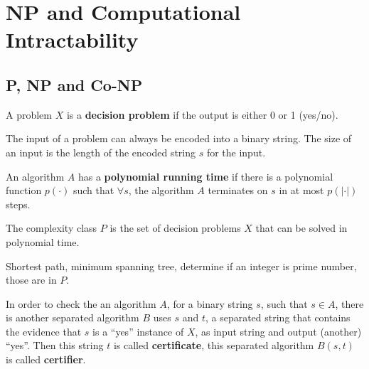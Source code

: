			\section{NP and Computational Intractability}
				\subsection{P, NP and Co-NP}
					\begin{definition}
						A problem $X$ is a \textbf{decision problem} if the output is either 0 or 1 (yes/no). 
					\end{definition}

					The input of a problem can always be encoded into a binary string. The size of an input is the length of the encoded string $s$ for the input.


					\begin{definition}
						An algorithm $A$ has a \textbf{polynomial running time} if there is a polynomial function $p(\cdot)$ such that $\forall s$, the algorithm $A$ terminates on $s$ in at most $p(|\cdot|)$ steps.
					\end{definition}

					\begin{definition}[P]
						The complexity class $P$ is the set of decision problems $X$ that can be solved in polynomial time.
					\end{definition}

					\begin{example}
						Shortest path, minimum spanning tree, determine if an integer is prime number, those are in $P$.
					\end{example}

					\begin{definition}
						In order to check the an algorithm $A$, for a binary string $s$, such that $s \in A$, there is another separated algorithm $B$ uses $s$ and $t$, a separated string that contains the evidence that $s$ is a ``yes'' instance of $X$, as input string and output (another) ``yes''. Then this string $t$ is called \textbf{certificate}, this separated algorithm $B(s, t)$ is called \textbf{certifier}. 
					\end{definition}

